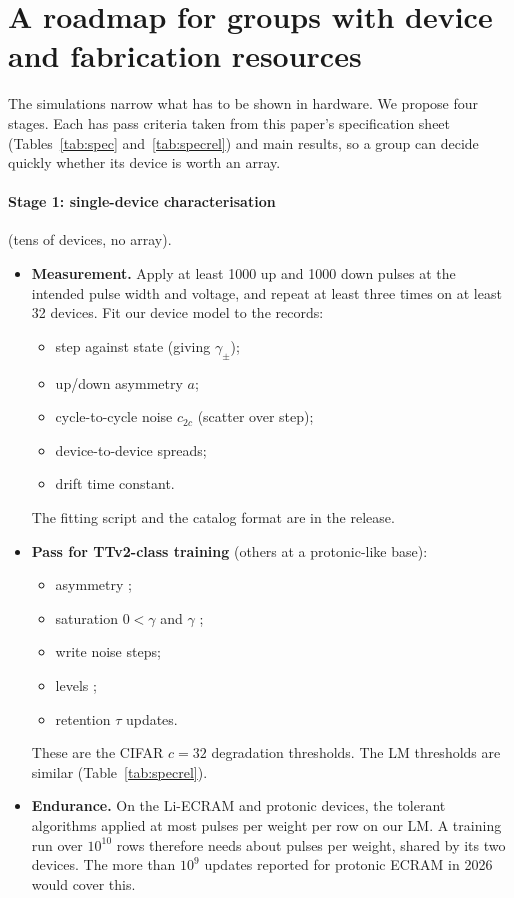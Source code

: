 \section{A roadmap for groups with device and fabrication resources}\label{sec:roadmap}
The simulations narrow what has to be shown in hardware. We propose four stages. Each has pass criteria taken from this paper's
specification sheet (Tables~\ref{tab:spec} and~\ref{tab:specrel}) and main results, so a group can decide quickly whether its
device is worth an array.

\paragraph{Stage 1: single-device characterisation} (tens of devices, no array).
\begin{itemize}
\item \textbf{Measurement.} Apply at least 1000 up and 1000 down pulses at the intended pulse width and voltage, and repeat at
      least three times on at least 32 devices. Fit our device model to the records:
      \begin{itemize}
      \item step against state (giving $\gamma_\pm$);
      \item up/down asymmetry $a$;
      \item cycle-to-cycle noise $c_{2c}$ (scatter over step);
      \item device-to-device spreads;
      \item drift time constant.
      \end{itemize}
      The fitting script and the catalog format are in the release.
\item \textbf{Pass for TTv2-class training} (others at a protonic-like base):
      \begin{itemize}
      \item asymmetry \RSpecrelTtvTwoCifarWThreeTwoAsym;
      \item saturation $0<\gamma$ and $\gamma$ \RSpecrelTtvTwoCifarWThreeTwoGamma{};
      \item write noise \RSpecrelTtvTwoCifarWThreeTwoCTwoc{} steps;
      \item levels \RSpecrelTtvTwoCifarWThreeTwoNStates;
      \item retention $\tau$ \RSpecrelTtvTwoCifarWThreeTwoTauSteps{} updates.
      \end{itemize}
      These are the CIFAR $c=32$ degradation thresholds. The LM thresholds are similar (Table~\ref{tab:specrel}).
\item \textbf{Endurance.} On the Li-ECRAM and protonic devices, the tolerant algorithms applied at most \RPpwrLmMax{} pulses per weight per row on our LM. A
      training run over $10^{10}$ rows therefore needs about \REndurTenTen{} pulses per weight, shared by its two devices. The more than $10^9$ updates reported for protonic ECRAM in
2026~\cite{xu2026} would cover this.
\end{itemize}

